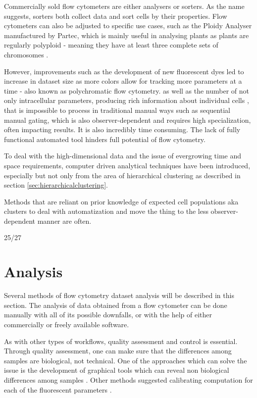 Commercially sold flow cytometers are either analysers or sorters. As the name suggests, sorters both collect data and sort cells by their properties. Flow cytometers can also be adjusted to specific use cases, such as the Ploidy Analyser manufactured by Partec, which is mainly useful in analysing plants as plants are regularly polyploid - meaning they have at least three complete sets of chromosomes \citep{zhang2003genetic, jacob1998pollen, geng2011genetic}. 

However, improvements such as the development of new fluorescent dyes led to increase in dataset size as more colors allow for tracking more parameters at a time - also known as polychromatic flow cytometry. as well as the number of not only intracellular parameters, producing rich information about individual cells \citep{wood20069}, that is impossible to process in traditional manual ways such as sequential manual gating, which is also observer-dependent and requires high specialization, often impacting results. It is also incredibly time consuming. The lack of fully functional automated tool hinders full potential of flow cytometry. 

To deal with the high-dimensional data and the issue of evergrowing time and space requirements, computer driven analytical techniques have been introduced, especially but not only from the area of hierarchical clustering as described in section \ref{sec:hierarchicalclustering}.

Methods that are reliant on prior knowledge of expected cell populations aka clusters \citep{lo2008automated, rogers2008cytometric, wilkins2001comparison, zeng2007feature} to deal with automatization and move the thing to the less observer-dependent manner are often. 

25/27

\section{Analysis}
\label{sec:analviagating}
Several methods of flow cytometry dataset analysis will be described in this section.
The analysis of data obtained from a flow cytometer can be done manually with all of its possible downfalls, or with the help of either commercially or freely available software. 

As with other types of workflows, quality assessment and control is essential. Through quality assessment, one can make sure that the differences among samples are biological, not technical. One of the approaches which can solve the issue is the development of graphical tools which can reveal non biological differences among samples \citep{le2007data}. Other methods suggested calibrating computation for each of the fluorescent parameters \citep{gratama1998flow}.

